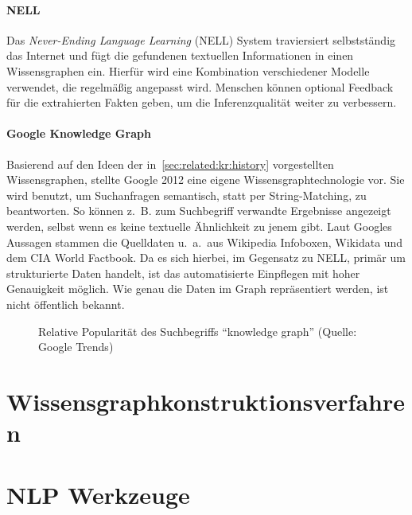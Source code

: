 \paragraph{NELL}
Das \textit{Never-Ending Language Learning} (NELL) System traviersiert selbstständig das Internet und fügt die gefundenen textuellen Informationen in einen Wissensgraphen ein.
Hierfür wird eine Kombination verschiedener Modelle verwendet, die regelmäßig angepasst wird.
Menschen können optional Feedback für die extrahierten Fakten geben, um die Inferenzqualität weiter zu verbessern.

\paragraph{Google Knowledge Graph}
Basierend auf den Ideen der in~\ref{sec:related:kr:history} vorgestellten Wissensgraphen, stellte Google 2012 eine eigene Wissensgraphtechnologie vor.
Sie wird benutzt, um Suchanfragen semantisch, statt per String-Matching, zu beantworten.
So können z.~B. zum Suchbegriff verwandte Ergebnisse angezeigt werden, selbst wenn es keine textuelle Ähnlichkeit zu jenem gibt.
Laut Googles Aussagen stammen die Quelldaten u.~a.\ aus Wikipedia Infoboxen, Wikidata und dem CIA World Factbook.
Da es sich hierbei, im Gegensatz zu NELL, primär um strukturierte Daten handelt, ist das automatisierte Einpflegen mit hoher Genauigkeit möglich.
Wie genau die Daten im Graph repräsentiert werden, ist nicht öffentlich bekannt.

\begin{figure}
	\caption{Relative Popularität des Suchbegriffs ``knowledge graph'' (Quelle: Google Trends)}\label{fig:related:kgTrend}
\end{figure}

\section{Wissensgraphkonstruktionsverfahren}
\label{sec:related:kbc}

\section{NLP Werkzeuge}
\label{sec:related:nlp}
